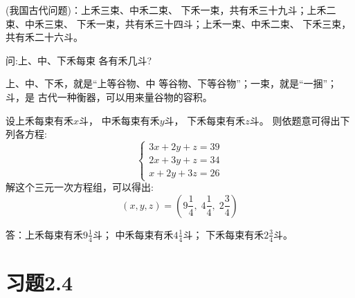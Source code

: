 \begin{example}
(我国古代问题)：上禾三束、中禾二束、
下禾一束，共有禾三十九斗；上禾二束、中禾三束、
下禾一束，共有禾三十四斗；上禾一束、中禾二束、
下禾三束，共有禾二十六斗。

问:上、中、下禾每束
各有禾几斗?
\end{example}

\begin{note}
    上、中、下禾，就是“上等谷物、中
    等谷物、下等谷物”；一束，就是“一捆”；斗，是
    古代一种衡器，可以用来量谷物的容积。
\end{note}

\begin{solution}
    设上禾每束有禾$x$斗，
    中禾每束有禾$y$斗，
    下禾每束有禾$z$斗。
    则依题意可得出下列各方程:
\[\begin{cases}
    3x+2y+z=39\\
    2x+3y+z=34\\
    x+2y+3z=26
\end{cases}\] 
解这个三元一次方程组，可以得出:
\[ (x,y,z)=\left(9\frac{1}{4},\; 4\frac{1}{4},\; 2\frac{3}{4}\right)\]

答：上禾每束有禾$9\frac{1}{4}$斗；
中禾每束有禾$4\frac{1}{4}$斗；
下禾每束有禾$2\frac{3}{4}$斗。
\end{solution}



\section*{习题2.4}

